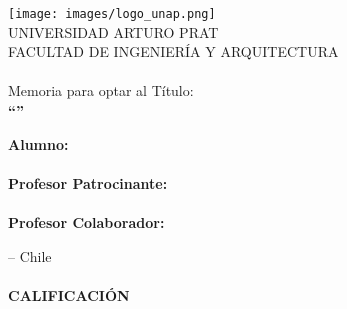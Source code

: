 \begin{titlepage}
\thispagestyle{empty}
\setlength{\parindent}{0pt}

\begingroup
\renewcommand{\baselinestretch}{1.15}\selectfont

\vspace*{-0.8cm}

\begin{center}
    \texttt{[image: images/logo\_unap.png]}\\[0.8cm]

    {\large UNIVERSIDAD ARTURO PRAT}\\[0.1cm]
    {\large FACULTAD DE INGENIERÍA Y ARQUITECTURA}\\[0.8cm]

    {\large \textbf{\MakeUppercase{\ttitle}}}\\[1.0cm]

    {\large Memoria para optar al Título:}\\[0.1cm]
    {\large \textbf{“\degreeTitle{}”}}\\[1.0cm]
\end{center}

\vfill

\begin{flushright}
  \begin{minipage}{0.55\textwidth}
    \raggedright
    {\normalsize
      \textbf{Alumno:}\\
      \alumno\\[0.25cm]

      \textbf{Profesor Patrocinante:}\\
      \profPatro\\[0.25cm]

      \textbf{Profesor Colaborador:}\\
      \profColab
    }
  \end{minipage}
\end{flushright}

\vfill

\begin{center}
    \normalsize
    \city{} – Chile\\
    \yearCover\\[0.3cm]
    \textbf{CALIFICACIÓN}
\end{center}

\endgroup
\end{titlepage}

